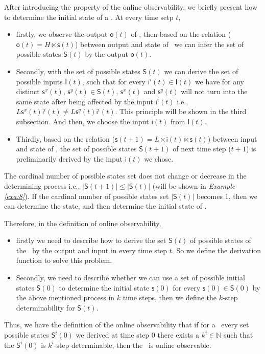 After introducing the property of the online observability, we briefly present how to determine the initial state of a \BCN. At every time setp $t$, 
\begin{itemize}
\item firstly, we observe the output $\mathsf{o}(t)$ of \BCN, then based on the relation ($\mathsf{o}(t)= H\ltimes{\mathsf{s}(t)}$) between output and state of \BCN\ we can infer the set of possible states $\mathsf{S}(t)$ by the output $\mathsf{o}(t)$.
\item Secondly, with the set of possible states $\mathsf{S}(t)$ we can derive the set of possible inputs $\mathsf{I}(t)$, such that for every $\mathsf{i}^{i}(t)\in \mathsf{I}(t)$ we have  for any distinct $\mathsf{s}^{x}(t)$, $\mathsf{s}^{y}(t) \in \mathsf{S}(t)$, $\mathsf{s}^{x}(t)$ and $\mathsf{s}^{y}(t)$ will not turn into the same state after being affected by the input $\mathsf{i}^{i}(t)$ i.e., $L\mathsf{s}^{x}(t) \mathsf{i}^{i}(t)\neq L\mathsf{s}^{y}(t) \mathsf{i}^{i}(t)$. This principle will be shown in the third subsection.  And then, we choose the input $\mathsf{i}(t)$ from $\mathsf{I}(t)$.
\item Thirdly, based on the relation ($\mathsf{s}(t+1)= L\ltimes{\mathsf{i}(t)}\ltimes{\mathsf{s}(t)}$) between input and state of \BCN, the set of possible states $\mathsf{S}(t+1)$ of next time step ($t+1$) is preliminarily derived by the input $\mathsf{i}(t)$ we chose. 
\end{itemize} 
 The cardinal number of possible states set does not change or decrease in the determining process i.e., $|\mathsf{S}(t+1)|\le|\mathsf{S}(t)|$ (will be shown in {\em Example \ref{exa:8}}). If the cardinal number of possible states set $|\mathsf{S}(t)|$ becomes $1$, then we can determine the state, and then determine the initial state of \BCN. 

Therefore, in the definition of online observability, 
\begin{itemize}
\item firstly we need to describe how to derive the set $\mathsf{S}(t)$ of possible states of the \BCN\ by the output and input in every time step $t$. So we define the derivation function to solve this problem.
\item  Secondly, we need to describe whether we can use a set of possible initial states $\mathsf{S}(0)$ to determine the initial state $\mathsf{s}(0)$ for every $\mathsf{s}(0) \in \mathsf{S}(0)$ by the above mentioned process in $k$ time steps, then we define the $k$-step determinability for $\mathsf{S}(t)$. 
\end{itemize} 
Thus, we have the definition of the online observability that if for a \BCN\ every set possible states $\mathsf{S}^{i}(0)$ we derived at time step $0$ there exists a $k^i\in \mathbb{N}$ such that the $\mathsf{S}^{i}(0)$ is $k^i$-step determinable, then the \BCN\ is online observable.

